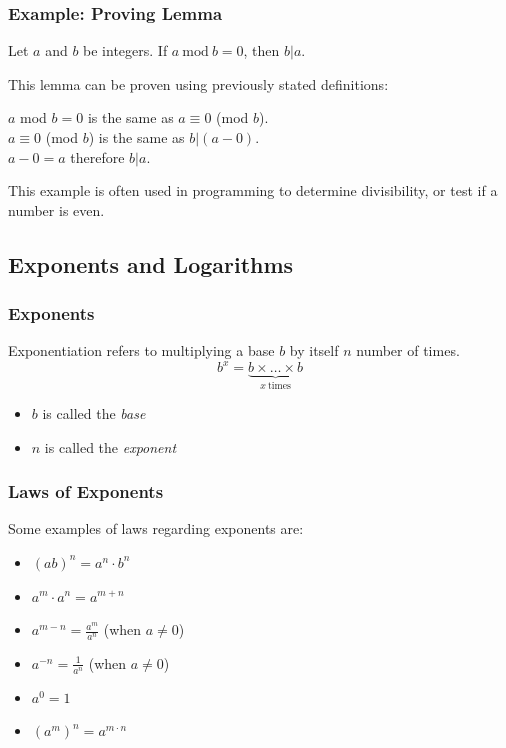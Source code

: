 \documentclass{article}
\begin{document}
\subsubsection{Example: Proving Lemma}
\begin{tcolorbox}[title=Lemma]
    Let \(a\) and \(b\) be integers. If \(a\ \text{mod}\ b = 0\), then \(b \vert a\).
\end{tcolorbox}
\noindent
This lemma can be proven using previously stated definitions:\\
\begin{center}
    \(a\) mod \(b = 0\) is the same as \(a \equiv 0\) (mod \(b\)).\\
    \(a \equiv 0\) (mod \(b\)) is the same as \(b \vert (a - 0)\).\\
    \(a - 0 = a\) therefore \(b \vert a\).
\end{center}
This example is often used in programming to determine divisibility, or test if a number is even.

\subsection{Exponents and Logarithms}
\subsubsection{Exponents}
Exponentiation refers to multiplying a base \(b\) by itself \(n\) number of times.
\[b^x = \underbrace{b \times \dots \times b}_{x\ \text{times}}\]
\begin{itemize}
    \item \(b\) is called the \emph{base}
    \item \(n\) is called the \emph{exponent}
\end{itemize}
%
\subsubsection{Laws of Exponents}
Some examples of laws regarding exponents are:
\begin{itemize}
    \item \((ab)^n = a^n \cdot b^n\)
    \item \(a^m \cdot a^n = a^{m+n}\)
    \item \(a^{m-n} = \frac{a^m}{a^n}\) (when \(a \neq 0\))
    \item \(a^{-n} = \frac{1}{a^n}\) (when \(a \neq 0\))
    \item \(a^0 = 1\)
    \item \((a^m)^n = a^{m \cdot n}\)
\end{itemize}
%
\end{document}
